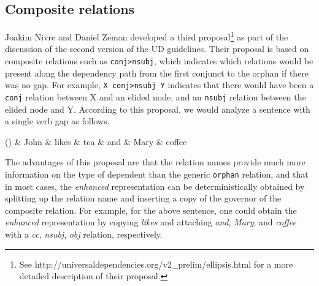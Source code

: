 \documentclass[11pt]{article}
\newenvironment{myquote}%
  {\list{}{\leftmargin=0.0in\rightmargin=0.0in}\item[]}%
  {\endlist}
\newcounter{excounter}
\begin{document}
\subsection{Composite relations}
 
Joakim Nivre and Daniel Zeman developed a third proposal\footnote{See http://universaldependencies.org/v2\_prelim/ellipsis.html for a more detailed description of their proposal.} as part of the discussion of the second version of the UD guidelines. Their proposal is based on composite relations such as \texttt{conj>nsubj}, which indicates which relations would be present along the dependency path from the first conjunct to the orphan if there was no gap. For example,  \texttt{X conj>nsubj Y} indicates that there would have been a \texttt{conj} relation between X and an elided node,  and an \texttt{nsubj} relation between the elided node and Y. According to this proposal, we would analyze a sentence with a single verb gap as follows.

\begin{myquote}
\label{ex:en-composite}
\footnotesize
  \begin{dependency}[edge unit distance=2.5ex]
    \begin{deptext}[column sep=0.3cm]
      (\theexcounter) \& John \& likes \& tea \& and \& Mary \& coffee \\
    \end{deptext}
  \end{dependency}
\end{myquote}
The advantages of this proposal are that the relation names provide much more information on the type of dependent than the generic \texttt{orphan} relation, and that in most cases, the \textit{enhanced} representation can be deterministically obtained by splitting up the relation name and inserting a copy of the governor of the composite relation. For example, for the above sentence, one could obtain the \textit{enhanced} representation by copying \textit{likes} and attaching \textit{and}, \textit{Mary}, and \textit{coffee} with a \textit{cc}, \textit{nsubj}, \textit{obj} relation, respectively.
\end{document}
